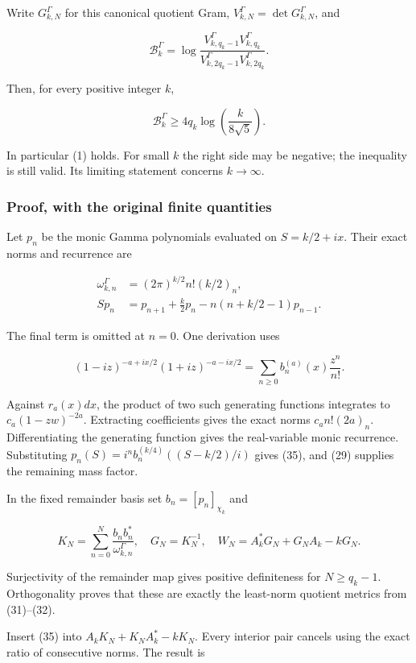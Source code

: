 \documentclass[
  11pt,
]{article}
\begin{document}
Write \(G_{k,N}^\Gamma\) for this canonical quotient Gram,
\(V_{k,N}^\Gamma=\det G_{k,N}^\Gamma\), and

\[
\mathcal B_k^\Gamma=
\log\frac{V_{k,q_k-1}^\Gamma V_{k,q_k}^\Gamma}
{V_{k,2q_k-1}^\Gamma V_{k,2q_k}^\Gamma}.
\tag{33}
\]

Then, for every positive integer \(k\),

\[
\boxed{\mathcal B_k^\Gamma\ge
4q_k\log\left(\frac{k}{8\sqrt5}\right).}
\tag{34}
\]

In particular (1) holds. For small \(k\) the right side may be negative;
the inequality is still valid. Its limiting statement concerns
\(k\to\infty\).

\subsubsection{Proof, with the original finite
quantities}\label{proof-with-the-original-finite-quantities}

Let \(p_n\) be the monic Gamma polynomials evaluated on \(S=k/2+ix\).
Their exact norms and recurrence are

\[
\begin{aligned}
\omega_{k,n}^\Gamma&=(2\pi)^{k/2}n!(k/2)_n,\\
Sp_n&=p_{n+1}+\frac{k}{2}p_n-n(n+k/2-1)p_{n-1}.
\end{aligned}
\tag{35}
\]

The final term is omitted at \(n=0\). One derivation uses

\[
(1-iz)^{-a+ix/2}(1+iz)^{-a-ix/2}
=\sum_{n\ge0}b_n^{(a)}(x)\frac{z^n}{n!}.
\]

Against \(r_a(x)dx\), the product of two such generating functions
integrates to \(c_a(1-zw)^{-2a}\). Extracting coefficients gives the
exact norms \(c_a n!(2a)_n\). Differentiating the generating function
gives the real-variable monic recurrence. Substituting
\(p_n(S)=i^n b_n^{(k/4)}((S-k/2)/i)\) gives (35), and (29) supplies the
remaining mass factor.

In the fixed remainder basis set \(b_n=[p_n]_{\chi_k}\) and

\[
K_N=\sum_{n=0}^N\frac{b_nb_n^*}{\omega_{k,n}^\Gamma},
\quad G_N=K_N^{-1},\quad
W_N=A_k^*G_N+G_NA_k-kG_N.
\tag{36}
\]

Surjectivity of the remainder map gives positive definiteness for
\(N\ge q_k-1\). Orthogonality proves that these are exactly the
least-norm quotient metrics from (31)--(32).

Insert (35) into \(A_kK_N+K_NA_k^*-kK_N\). Every interior pair cancels
using the exact ratio of consecutive norms. The result is
\end{document}
